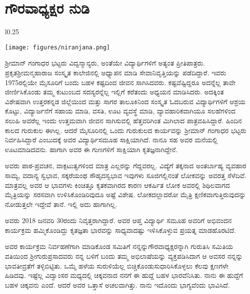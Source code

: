 {\fontsize{14}{16}\selectfont
\chapter{ಗೌರವಾಧ್ಯಕ್ಷರ ನುಡಿ}

\begin{wrapfigure}{l}{0.25\textwidth}
\centerline{\texttt{[image: figures/niranjana.png]}}
\end{wrapfigure}
ಶ್ರೀಮಾನ್ ಗಂಗಾಧರ ಭಟ್ಟರು ವಿದ್ವನ್ಮಾನ್ಯರು, ಅಂತೆಯೇ ವಿದ್ಯಾರ್ಥಿಗಳಿಗೆ ಅತ್ಯಂತ ಪ್ರೀತಿಪಾತ್ರರು. ಪ್ರಕೃತ\break ಶ್ರೀಮನ್ಮಹಾರಾಜ ಸಂಸ್ಕೃತ ಕಾಲೇಜಿನಲ್ಲಿ ಅಧ್ಯಾಪನ ಮಾಡಿ ಸೇವಾನಿವೃತ್ತಿಯನ್ನು ಪಡೆದಿದ್ದಾರೆ. ಇವರು 1975ರಲ್ಲಿಯೇ ಮೈಸೂರಿಗೆ ಬಂದು ಬಹಳ ಕಷ್ಟದಿಂದ ಜೀವನ ಸಾಗಿಸಿದವರು. ಕಷ್ಟವೆಷ್ಟಿದ್ದರೂ ಅದನ್ನೆಲ್ಲ ತಾವೇ ಜೀರ್ಣಿಸಿಕೊಂಡು ತಮ್ಮ ಕುಟುಂಬದ ಸದಸ್ಯರನ್ನೆಲ್ಲ ಇಲ್ಲಿಗೆ ಕರೆತಂದು ಅಧ್ಯಯನ ಮಾಡಿಸಿದರು. ಅದಕ್ಕಿಂತ ವಿಶೇಷವಾಗಿ ಉತ್ತರಕನ್ನಡ ಜಿಲ್ಲೆಯಿಂದ ಮತ್ತು ಸಾಗರ ತಾಲೂಕಿನಿಂದ ಸಂಸ್ಕೃತ ಓದಬರುವ ವಿದ್ಯಾರ್ಥಿಗಳಿಗೆ ಆಶ್ರಯ ಕೊಟ್ಟು, ವಿದ್ಯಾರ್ಜನೆಗೆ ಸಹಾಯ ಮಾಡಿ, ವಸತಿ, ಊಟ ವ್ಯವಸ್ಥೆ ಮಾಡಿ, ವ್ಯಾವಹಾರಿಕವಾಗಿಯೂ ಸಲಹೆ\-ಗಳಿಂದ ಸಲುಹಿ ಅವರೆಲ್ಲ ಇಂದು ಉತ್ತಮವಾಗಿ ಜೀವನ ಸಾಗಿಸುವಲ್ಲಿ ಹೆತ್ತವರಿಗಿಂತ ಮಿಗಿಲಾದ ಪಾತ್ರ\-ವಹಿಸಿದ್ದಾರೆ. ಹಿಂದಿನ ಕಾಲದ ಗುರುಕುಲ ಈಗಿಲ್ಲ. ಆದರೆ ಮೈಸೂರಿನಲ್ಲಿ ಒಂದು ಗುರುಕುಲದ ಕಾರ್ಯವನ್ನು ಶ್ರೀಮಾನ್ ಗಂಗಾಧರ ಭಟ್ಟರು ನಿರ್ವಹಿಸಿದ್ದಾರೆ ಎಂಬುದಕ್ಕೆ ಅವರ ವಿದ್ಯಾರ್ಥಿಸಮೂಹ ಸಾಕ್ಷಿಯಾಗಿದೆ. ನಾನೂ ಸಹ ಅವರ ಮನೆಯಲ್ಲಿ ಊಟಮಾಡಿದವನು. ಹಾಗಾಗಿ ಅವರ ಈ ಗುಣಗಳಿಗೆ ಸಾಕ್ಷಿಯಾಗಿ ಕೃತಜ್ಞನಾಗಿದ್ದೇನೆ.
	
ಅವರು ಪಾಠ-ಪ್ರವಚನ, ವಾಕ್ಪಟುತ್ವಗಳಿಂದ ಮಾತ್ರ ಎಲ್ಲರನ್ನು ಗೆದ್ದವರಲ್ಲ. ವಿದ್ಯೆಗೆ ತಕ್ಕನಾದ ಅಂತರ್ಬಾಹ್ಯ ವ್ಯವಹಾರ ಸಾಮ್ಯ, ವದಾನ್ಯ ಸ್ವಭಾವ, ಸಕ್ಕರೆಯಂಥ ಸೌಹೃದಸ್ವಭಾವ ಇವುಗಳು ಸೂಜಿಗಲ್ಲಿನಂತೆ ಲೋಕವನ್ನು ಅವರತ್ತ ಸೆಳೆದಿವೆ. ಮಾತ್ರವಲ್ಲ ಅವರ ಆ ಭಾವಗಳು ಕಿಂಚಿತ್ತೂ ಕೃತಕವಾಗಿರದ ಕಾರಣ ಆಕರ್ಷಿತ ಲೋಕ ಅವರಲ್ಲಿ ಶಿಥಿಲವಾಗದ ಮೈತ್ರಿಯನ್ನು ಸರಸವಾಗಿ ಉಳಿಸಿಕೊಂಡಿರಿವುದೂ ಅಷ್ಟೆ ವಿಶೇಷ. ಲೋಕದಲ್ಲಾದರೋ ಮೈತ್ರಿ ಕ್ಷಣಿಕವಾಗುತ್ತಿರುವುದನ್ನು ನೋಡುತ್ತಲೇ ಇದ್ದೇವೆ ತಾನೆ. ಇಲ್ಲಿ ಅದು ಹಾಗಾಗಿಲ್ಲ.
\eject
 
ಅವರು 2018 ಜನವರಿ 30ರಂದು ನಿವೃತ್ತರಾಗಿದ್ದಾರೆ. ಅವರ ಆಪ್ತ ವಿದ್ಯಾರ್ಥಿ ಸಮೂಹ ಅವರಿಗೆ ಅಭಿವಂದನ ಕಾರ್ಯಕ್ರಮ ಹಮ್ಮಿಕೊಂಡಿದ್ದು ಕೃತಜ್ಞತಾ ಭಾರವನ್ನು ಸಾಧ್ಯವಾದಷ್ಟು ಇಳಿಸಿಕೊಳ್ಳುವ ಪ್ರಯತ್ನ ಮಾಡಹೊರಟಿದೆ. 
\vskip 4pt

ಅವರ ಕಾರ್ಯಕ್ರಮ ನಿರ್ವಹಣೆಗಾಗಿ ಮಾಡಿಕೊಂಡ ಸಮಿತಿಗೆ ನನ್ನನ್ನು\break ಗೌರವಾಧ್ಯಕ್ಷರನ್ನಾಗಿ ಗುರುತಿಸಿ ಸಮಿತಿಯ ವತಿಯಿಂದ ಶ್ರೀಗುರುಪ್ರಸಾದವರು ನನ್ನ ಬಳಿಗೆ ಬಂದು ತಮ್ಮ ಅಭಿಲಾಷೆಯನ್ನು ವ್ಯಕ್ತಪಡಿಸಿದಾಗ ಆ ಅವಸರ ನನ್ನನ್ನು ಭಾವತೀವ್ರತೆಗೆ ತಳ್ಳಿಬಿಟ್ಟಿತು. ಒಮ್ಮೆ ಹಳೆಯ ಸುರುಳಿಯೆಲ್ಲ ಬಿಚ್ಚಿಕೊಂಡು\break ಸುಧಾರಿಸಿಕೊಳ್ಳಲು ಕೆಲವು ಕ್ಷಣಗಳೇ ಹಿಡಿದವು. ಇಷ್ಟೆಲ್ಲ ವಿದ್ವಾಂಸರ ಮಧ್ಯದಲ್ಲಿ ಚಿಕ್ಕವನಾದ ನನಗೆ ಈ ಹುದ್ದೆ ಬಹಳ ಭಾರವೆನಿಸಿತು. ನಾನು ಈ ಹುದ್ದೆಗೆ ಬಹಳ ಚಿಕ್ಕವನು ಎಂದೆ. ಆದರೆ ಅವರ ಒತ್ತಾಸೆ ಅಚಲವಾಗಿತ್ತು. ನಾನು ಇದೊಂದು ಭಾಗ್ಯವೆಂದು ಭಾವಿಸಿದೆ.
\vskip 4pt

}
